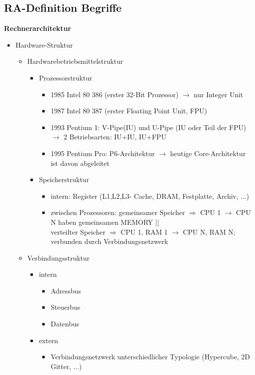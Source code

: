 \subsection{RA-Definition Begriffe}
\textbf{Rechnerarchitektur}
	\begin{itemize}
		\item Hardware-Struktur
		\begin{itemize}
			\item Hardwarebetriebsmittelstruktur
			\begin{itemize}
				\item Prozessorstruktur
				\begin{itemize}
					\item 1985 Intel 80 386 (erster 32-Bit Prozessor) \(\to\) nur Integer Unit
					\item 1987 Intel 80 387 (erster Floating Point Unit, FPU)
					\item 1993 Pentium 1: V-Pipe(IU) und U-Pipe (IU oder Teil der FPU) \(\to\) 2 Betriebsarten: IU+IU, IU+FPU
					\item 1995 Pentium Pro: P6-Architektur \(\to\) heutige Core-Architektur ist davon abgeleitet
				\end{itemize}
				\item Speicherstruktur
				\begin{itemize}
					\item intern: Register (L1,L2,L3- Cache, DRAM, Festplatte, Archiv, ...)
					\item zwischen Prozessoren: gemeinsamer Speicher \(\Rightarrow\) CPU 1 \(\to\) CPU N haben gemeinsamen MEMORY || \\ verteilter Speicher \(\Rightarrow\) CPU 1, RAM 1 \(\to\) CPU N, RAM N; verbunden durch Verbindungsnetzwerk
				\end{itemize}
			\end{itemize}
			\item Verbindungsstruktur
			\begin{itemize}
				\item intern
				\begin{itemize}
					\item Adressbus
					\item Steuerbus
					\item Datenbus
				\end{itemize}
				\item extern 
				\begin{itemize}
					\item Verbindungsnetzwerk unterschiedlicher Typologie (Hypercube, 2D Gitter, ...)

\end{itemize}
\end{itemize}
\end{itemize}
\end{itemize}
